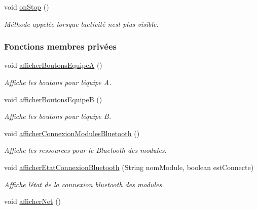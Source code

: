 \begin{DoxyCompactItemize}
void \hyperlink{classcom_1_1example_1_1area_1_1_i_h_m_gestion_partie_a67aa6746480bdba2a5744a2ff8d6c48d}{on\+Stop} ()
\begin{DoxyCompactList}\small\item\em Méthode appelée lorsque l\textquotesingle{}activité n\textquotesingle{}est plus visible. \end{DoxyCompactList}\end{DoxyCompactItemize}
\subsubsection*{Fonctions membres privées}
\begin{DoxyCompactItemize}
\item 
void \hyperlink{classcom_1_1example_1_1area_1_1_i_h_m_gestion_partie_a6c63ebbc9822ef53f43468d100ab5677}{afficher\+Boutons\+EquipeA} ()
\begin{DoxyCompactList}\small\item\em Affiche les boutons pour l\textquotesingle{}équipe A. \end{DoxyCompactList}\item 
void \hyperlink{classcom_1_1example_1_1area_1_1_i_h_m_gestion_partie_a00c0111f1b2d4d1161515e2c04ca645c}{afficher\+Boutons\+EquipeB} ()
\begin{DoxyCompactList}\small\item\em Affiche les boutons pour l\textquotesingle{}équipe B. \end{DoxyCompactList}\item 
void \hyperlink{classcom_1_1example_1_1area_1_1_i_h_m_gestion_partie_ade4de81cd6978057a06e16e2e577180c}{afficher\+Connexion\+Modules\+Bluetooth} ()
\begin{DoxyCompactList}\small\item\em Affiche les ressources pour le Bluetooth des modules. \end{DoxyCompactList}\item 
void \hyperlink{classcom_1_1example_1_1area_1_1_i_h_m_gestion_partie_a73fa6d212cf9c5e4dc8fadc96d8d35e9}{afficher\+Etat\+Connexion\+Bluetooth} (String nom\+Module, boolean est\+Connecte)
\begin{DoxyCompactList}\small\item\em Affiche l\textquotesingle{}état de la connexion bluetooth des modules. \end{DoxyCompactList}\item 
void \hyperlink{classcom_1_1example_1_1area_1_1_i_h_m_gestion_partie_a1892c3b33ec5d93514dfa8e30f61204d}{afficher\+Net} ()

\end{DoxyCompactItemize}
